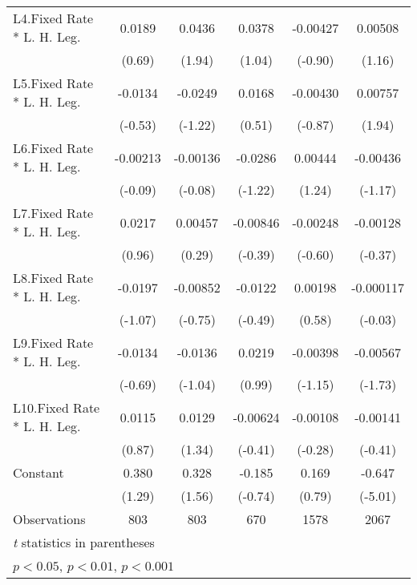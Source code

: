 {\begin{longtable}{l*{5}{c}}
L4.Fixed Rate * L. H. Leg.&   0.0189         &   0.0436         &   0.0378         & -0.00427         &  0.00508         \\
                &   (0.69)         &   (1.94)         &   (1.04)         &  (-0.90)         &   (1.16)         \\
[1em]
L5.Fixed Rate * L. H. Leg.&  -0.0134         &  -0.0249         &   0.0168         & -0.00430         &  0.00757         \\
                &  (-0.53)         &  (-1.22)         &   (0.51)         &  (-0.87)         &   (1.94)         \\
[1em]
L6.Fixed Rate * L. H. Leg.& -0.00213         & -0.00136         &  -0.0286         &  0.00444         & -0.00436         \\
                &  (-0.09)         &  (-0.08)         &  (-1.22)         &   (1.24)         &  (-1.17)         \\
[1em]
L7.Fixed Rate * L. H. Leg.&   0.0217         &  0.00457         & -0.00846         & -0.00248         & -0.00128         \\
                &   (0.96)         &   (0.29)         &  (-0.39)         &  (-0.60)         &  (-0.37)         \\
[1em]
L8.Fixed Rate * L. H. Leg.&  -0.0197         & -0.00852         &  -0.0122         &  0.00198         &-0.000117         \\
                &  (-1.07)         &  (-0.75)         &  (-0.49)         &   (0.58)         &  (-0.03)         \\
[1em]
L9.Fixed Rate * L. H. Leg.&  -0.0134         &  -0.0136         &   0.0219         & -0.00398         & -0.00567         \\
                &  (-0.69)         &  (-1.04)         &   (0.99)         &  (-1.15)         &  (-1.73)         \\
[1em]
L10.Fixed Rate * L. H. Leg.&   0.0115         &   0.0129         & -0.00624         & -0.00108         & -0.00141         \\
                &   (0.87)         &   (1.34)         &  (-0.41)         &  (-0.28)         &  (-0.41)         \\
[1em]
Constant        &    0.380         &    0.328         &   -0.185         &    0.169         &   -0.647\sym{***}\\
                &   (1.29)         &   (1.56)         &  (-0.74)         &   (0.79)         &  (-5.01)         \\
\hline
Observations    &      803         &      803         &      670         &     1578         &     2067         \\
\hline\hline
\multicolumn{6}{l}{\footnotesize \textit{t} statistics in parentheses}\\
\multicolumn{6}{l}{\footnotesize \sym{*} \(p<0.05\), \sym{**} \(p<0.01\), \sym{***} \(p<0.001\)}\\
\end{longtable}
}
